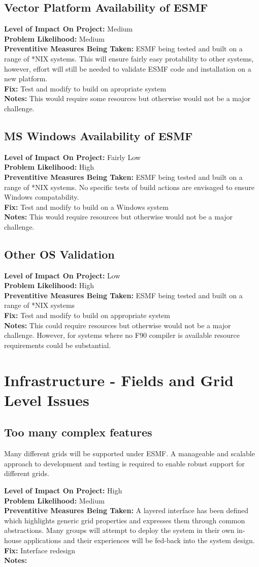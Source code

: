 \documentclass[english]{article}
\newcommand{\req}[1]{\section{\hspace{.2in}#1}}
\newcommand{\sreq}[1]{\subsection{\hspace{.2in}#1}}
\newenvironment
{reqlist}
{\begin{list} {} {} \rm \item[]}
{\end{list}}
\begin{document}
\sreq{Vector Platform Availability of ESMF}
\begin{reqlist}
{\bf Level of Impact On Project:} Medium \\
{\bf Problem Likelihood:} Medium\\
{\bf Preventitive Measures Being Taken:} ESMF being tested and built on a range of *NIX systems. This will
ensure fairly easy protability to other systems, however, effort will still be needed 
to validate ESMF code and installation on a new platform. \\
{\bf Fix:} Test and modify to build on apropriate system\\
{\bf Notes:} This would require some resources but otherwise would not be a major challenge.
\end{reqlist}

\sreq{MS Windows Availability of ESMF}
\begin{reqlist}
{\bf Level of Impact On Project:} Fairly Low \\
{\bf Problem Likelihood:} High \\
{\bf Preventitive Measures Being Taken:}  ESMF being tested and built on a range of *NIX systems.
No specific tests of build actions are envisaged to ensure Windows compatability.\\
{\bf Fix:} Test and modify to build on a Windows system\\
{\bf Notes:} This would require resources but otherwise would not be a major challenge.
\end{reqlist}

\sreq{Other OS Validation}
\begin{reqlist}
{\bf Level of Impact On Project:} Low \\
{\bf Problem Likelihood:} High \\
{\bf Preventitive Measures Being Taken:} ESMF being tested and built on a range of *NIX systems\\
{\bf Fix:}  Test and modify to build on appropriate system\\
{\bf Notes:} This could require resources but otherwise would not be a major challenge.
However, for systems where no F90 compiler is available resource requirements could be substantial.
\end{reqlist}

\req{Infrastructure - Fields and Grid Level Issues}
\sreq{Too many complex features}
Many different grids will be supported under ESMF. A manageable and scalable approach
to development and testing is required to enable robust support for different grids.
\begin{reqlist}
{\bf Level of Impact On Project:} High \\
{\bf Problem Likelihood:} Medium \\
{\bf Preventitive Measures Being Taken:} A layered interface has been defined 
which highlights generic grid properties and expresses them through common abstractions.
Many groups will attempt to deploy the system in their own in-house
applications and their experiences will be fed-back into the system design.\\
{\bf Fix:} Interface redesign \\
{\bf Notes:} 
\end{reqlist}
\end{document}
